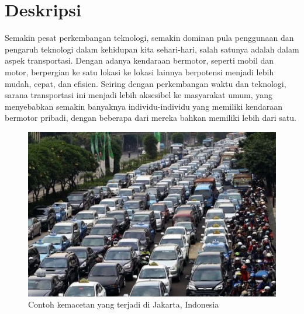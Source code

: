 \documentclass[a4paper,twoside]{article}
\begin{document}
\title{\@judultopik}
\author{\nama \textendash \@npm} 

\newcommand{\nama}{Alfred Aprianto Liaunardi}
\newcommand{\@npm}{6181801014}
\newcommand{\@judultopik}{Perkakas Command Line KIRI} %
\newcommand{\jumpemb}{1} %
\newcommand{\tanggal}{14/03/2022}


\maketitle


\section{Deskripsi}
Semakin pesat perkembangan teknologi, semakin dominan pula penggunaan dan pengaruh teknologi dalam kehidupan kita sehari-hari, salah satunya adalah dalam aspek transportasi. Dengan adanya kendaraan bermotor, seperti mobil dan motor, berpergian ke satu lokasi ke lokasi lainnya berpotensi menjadi lebih mudah, cepat, dan efisien. Seiring dengan perkembangan waktu dan teknologi, sarana transportasi ini menjadi lebih aksesibel ke masyarakat umum, yang menyebabkan semakin banyaknya individu-individu yang memiliki kendaraan bermotor pribadi, dengan beberapa dari mereka bahkan memiliki lebih dari satu.

\begin{figure}[h]
	\centering
	\includegraphics[scale=0.25]{macet}
	\caption[Contoh kemacetan yang terjadi di Jakarta]{Contoh kemacetan yang terjadi di Jakarta, Indonesia}
	\label{fig:macet}
\end{figure}
\end{document}
